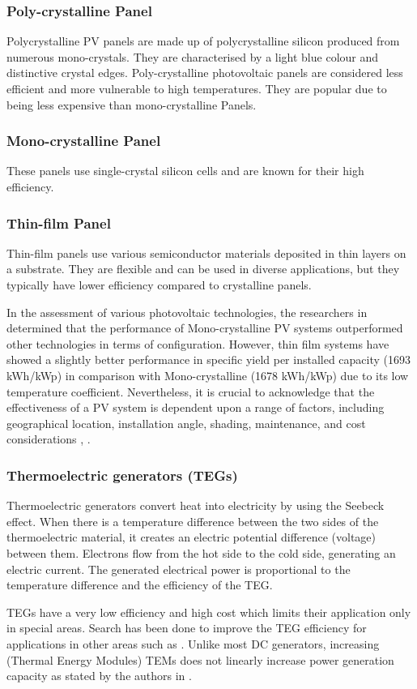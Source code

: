 \subsubsection{Poly-crystalline Panel}
Polycrystalline PV panels are made up of polycrystalline silicon produced from numerous mono-crystals. They are characterised by a light blue colour and distinctive crystal edges. Poly-crystalline photovoltaic panels are considered less efficient and more vulnerable to high temperatures. They are popular due to being less expensive than mono-crystalline Panels.
\subsubsection{Mono-crystalline Panel}
These panels use single-crystal silicon cells and are known for their high efficiency.
\subsubsection{Thin-film Panel}
Thin-film panels use various semiconductor materials deposited in thin layers on a substrate. They are flexible and can be used in diverse applications, but they typically have lower efficiency compared to crystalline panels.\par
In the assessment of various photovoltaic technologies, the researchers in \cite{10} determined that the performance of Mono-crystalline PV systems outperformed other technologies in terms of configuration. However, thin film systems have showed a slightly better performance in specific yield per installed capacity (1693 kWh/kWp) in comparison with Mono-crystalline (1678 kWh/kWp) due to its low temperature coefficient. Nevertheless, it is crucial to acknowledge that the effectiveness of a PV system is dependent upon a range of factors, including geographical location, installation angle, shading, maintenance, and cost considerations \cite{11}, \cite{12}.\par
\subsubsection{Thermoelectric generators (TEGs)} 
Thermoelectric generators convert heat into electricity by using the Seebeck effect. When there is a temperature difference between the two sides of the thermoelectric material, it creates an electric potential difference (voltage) between them. Electrons flow from the hot side to the cold side, generating an electric current. The generated electrical power is proportional to the temperature difference and the efficiency of the TEG.\par
TEGs have a very low efficiency and high cost \cite{13} which limits their application only in special areas. Search has been done to improve the TEG efficiency for applications in other areas such as \cite{14}. Unlike most DC generators, increasing (Thermal Energy Modules) TEMs does not linearly increase power generation capacity as stated by the authors in \cite{15}.\par
